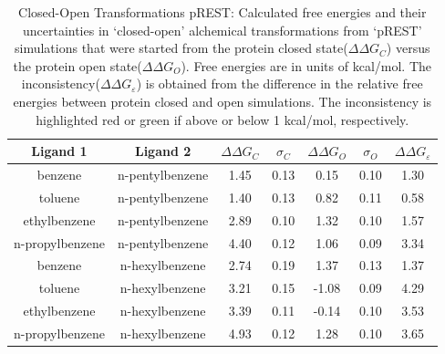 \begin{table}[!htb]
\centering
\caption{Closed-Open Transformations pREST:
Calculated free energies and their uncertainties in `closed-open' alchemical transformations from `pREST' simulations that were started from the protein closed state(\boldmath$\Delta\Delta G_{C}$) versus the protein open state(\boldmath$\Delta\Delta G_{O}$).
Free energies are in units of kcal/mol. 
The inconsistency(\boldmath$\Delta\Delta G_{\varepsilon}$) is obtained from the difference in the relative free energies between protein closed and open simulations. 
The inconsistency is highlighted red or green if above or below 1 kcal/mol, respectively. 
}
\label{tbl:C-O_pREST}
\begin{tabular}{|c|c|c|c|c|c|c|}
\hline
\textbf{Ligand 1}       & \textbf{Ligand 2}    & \boldmath$\Delta\Delta G_{C}$ & \boldmath$\sigma_{C}$ & \boldmath$\Delta\Delta G_{O}$ & \boldmath$\sigma_{O}$ & \boldmath$\Delta\Delta G_{\varepsilon}$\\ \hline
benzene         & n-pentylbenzene & 1.45                                   & 0.13                       & 0.15                                & 0.10                       & \cellcolor[HTML]{FFCCC9}1.30 \\ \hline
toluene         & n-pentylbenzene & 1.40                                   & 0.13                       & 0.82                                 & 0.11                       & \cellcolor[HTML]{9AFF99}0.58 \\ \hline
ethylbenzene    & n-pentylbenzene & 2.89                                   & 0.10                       & 1.32                                 & 0.10                      & \cellcolor[HTML]{FFCCC9}1.57 \\ \hline
n-propylbenzene & n-pentylbenzene & 4.40                                   & 0.12                       & 1.06                                & 0.09                       & \cellcolor[HTML]{FFCCC9}3.34 \\ \hline
benzene         & n-hexylbenzene  & 2.74                                   & 0.19                       & 1.37                                & 0.13                       & \cellcolor[HTML]{FFCCC9}1.37 \\ \hline
toluene         & n-hexylbenzene  & 3.21                                   & 0.15                       & -1.08                                & 0.09                       & \cellcolor[HTML]{FFCCC9}4.29 \\ \hline
ethylbenzene    & n-hexylbenzene  & 3.39                                   & 0.11                       & -0.14                                & 0.10                       & \cellcolor[HTML]{FFCCC9}3.53 \\ \hline
n-propylbenzene & n-hexylbenzene  & 4.93                                   & 0.12                       & 1.28                                 & 0.10                       & \cellcolor[HTML]{FFCCC9}3.65 \\ \hline
\end{tabular}
\end{table}

